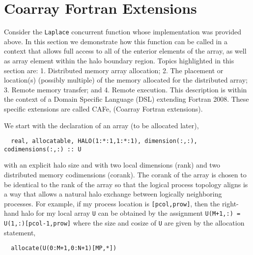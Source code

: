 \section{Coarray Fortran Extensions}


Consider the \texttt{Laplace} concurrent function whose implementation was provided above.
In this section we demonstrate how this function can be called in a context that allows
full access to all of the enterior elements of the array, as well as array element within
the halo boundary region.  Topics highlighted in this section are: 1. Distributed memory
array allocation; 2. The placement or location(s) (possibly multiple) of the memory
allocated for the distributed array; 3. Remote memory transfer; and 4. Remote execution.
This description is within the context of a Domain Specific Language (DSL) extending
Fortran 2008.  These specific extensions are called CAFe, (Coarray Fortran extensions).

We start with the declaration of an array (to be allocated later),
\begin{verbatim}
  real, allocatable, HALO(1:*:1,1:*:1), dimension(:,:), codimensions(:,:) :: U
\end{verbatim}
with an explicit halo size and with two local dimensions (rank) and two distributed memory
codimensions (corank).  The corank of the array is chosen to be identical to the rank of
the array so that the logical process topology aligns is a way that allows a natural
halo exchange between logically neighboring processes.  For example, if my process
location is \texttt{[pcol,prow]}, then the right-hand halo for my local array \texttt{U}
can be obtained by the assignment \texttt{U(M+1,:) = U(1,:)[pcol-1,prow]} where the size
and cosize of \texttt{U} are given by the allocation statement,
\begin{verbatim}
  allocate(U(0:M+1,0:N+1)[MP,*])
\end{verbatim}

